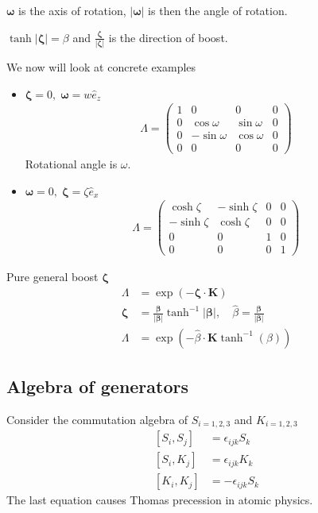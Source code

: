 $\pmb{\omega}$ is the axis of rotation, $|\pmb{\omega}|$ is then the angle of rotation.

$\tanh{|\pmb{\zeta}|} = \beta$ and $\frac{\pmb{\zeta}}{|\pmb{\zeta}|}$ is the direction of boost.

We now will look at concrete examples
\begin{itemize}
   \item $\pmb{\zeta} = 0,\; \pmb{\omega} = w \hat{e}_z$
      \begin{align*}
         \Lambda = \begin{pmatrix} 1 & 0 & 0 & 0 \\ 0 & \cos{\omega} & \sin{\omega} & 0 \\ 0 & -\sin{\omega} & \cos{\omega} & 0 \\ 0 & 0 & 0 & 0\end{pmatrix}
      \end{align*}
      Rotational angle is $\omega$.
   \item $\pmb{\omega} = 0, \; \pmb{\zeta} = \zeta \hat{e}_x$
      \begin{align*}
         \Lambda = \begin{pmatrix} \cosh{\zeta} & -\sinh{\zeta} & 0 & 0 \\ -\sinh{\zeta} & \cosh{\zeta} & 0 & 0 \\ 0 & 0 & 1 & 0 \\ 0 & 0 & 0 & 1\end{pmatrix}
      \end{align*}
\end{itemize}


Pure general boost $\pmb{\zeta}$
\begin{align*}
   \Lambda &= \exp(-\pmb{\zeta} \cdot \pmb{K}) \\
   \pmb{\zeta} &= \frac{\pmb{\beta}}{|\pmb{\beta}|} \tanh^{-1} |\pmb{\beta}|, \quad \hat{\beta} = \frac{\pmb{\beta}}{|\pmb{\beta}|} \\
   \Lambda &= \exp(-\hat{\beta} \cdot \pmb{K} \tanh^{-1}(\beta))
\end{align*}

\subsection{Algebra of generators}

Consider the commutation algebra of $S_{i=1,2,3}$ and $K_{i=1,2,3}$
\begin{align}
   \left[ S_i, S_j \right] &= \epsilon_{ijk} S_k  \\
   \left[ S_i, K_j \right] &= \epsilon_{ijk} K_k \\
   \left[ K_i, K_j \right] &= - \epsilon_{ijk} S_k
\end{align}
The last equation causes Thomas precession in atomic physics.

